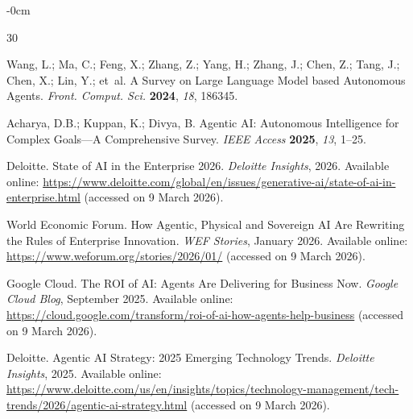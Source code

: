 \documentclass[ai,article,submit,pdftex,moreauthors]{Definitions/mdpi}
\begin{document}





\begin{adjustwidth}{-\extralength}{0cm}

\begin{thebibliography}{30}

Wang, L.; Ma, C.; Feng, X.; Zhang, Z.; Yang, H.; Zhang, J.; Chen, Z.; Tang, J.; Chen, X.; Lin, Y.; et~al.
A Survey on Large Language Model based Autonomous Agents.
\textit{Front. Comput. Sci.} \textbf{2024}, \textit{18}, 186345.

Acharya, D.B.; Kuppan, K.; Divya, B.
Agentic AI: Autonomous Intelligence for Complex Goals---A Comprehensive Survey.
\textit{IEEE Access} \textbf{2025}, \textit{13}, 1--25.

Deloitte.
State of AI in the Enterprise 2026.
\textit{Deloitte Insights}, 2026.
Available online: \url{https://www.deloitte.com/global/en/issues/generative-ai/state-of-ai-in-enterprise.html} (accessed on 9 March 2026).

World Economic Forum.
How Agentic, Physical and Sovereign AI Are Rewriting the Rules of Enterprise Innovation.
\textit{WEF Stories}, January 2026.
Available online: \url{https://www.weforum.org/stories/2026/01/} (accessed on 9 March 2026).

Google Cloud.
The ROI of AI: Agents Are Delivering for Business Now.
\textit{Google Cloud Blog}, September 2025.
Available online: \url{https://cloud.google.com/transform/roi-of-ai-how-agents-help-business} (accessed on 9 March 2026).

Deloitte.
Agentic AI Strategy: 2025 Emerging Technology Trends.
\textit{Deloitte Insights}, 2025.
Available online: \url{https://www.deloitte.com/us/en/insights/topics/technology-management/tech-trends/2026/agentic-ai-strategy.html} (accessed on 9 March 2026).


\end{thebibliography}
\end{adjustwidth}
\end{document}
